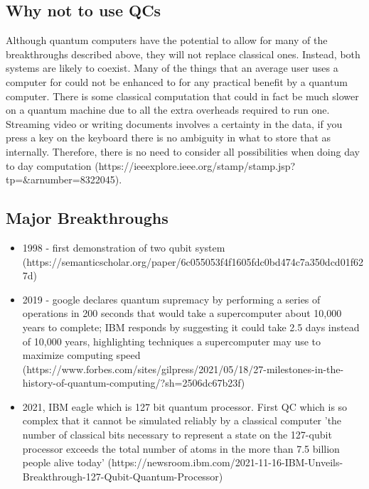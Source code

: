 \subsection{Why not to use QCs}
Although quantum computers have the potential to allow for many of the breakthroughs described above, they will not replace classical ones. Instead, both systems are likely to coexist. Many of the things that an average user uses a computer for could not be enhanced to for any practical benefit by a quantum computer. There is some classical computation that could in fact be much slower on a quantum machine due to all the extra overheads required to run one. Streaming video or writing documents involves a certainty in the data, if you press a key on the keyboard there is no ambiguity in what to store that as internally. Therefore, there is no need to consider all possibilities when doing day to day computation (https://ieeexplore.ieee.org/stamp/stamp.jsp?tp=&arnumber=8322045).

\subsection{Major Breakthroughs}
\begin{itemize}
    \item 1998 - first demonstration of two qubit system (https://semanticscholar.org/paper/6c055053f4f1605fdc0bd474c7a350dcd01f627d)
    \item 2019 - google declares quantum supremacy by performing a series of operations in 200 seconds that would take a supercomputer about 10,000 years to complete; IBM responds by suggesting it could take 2.5 days instead of 10,000 years, highlighting techniques a supercomputer may use to maximize computing speed (https://www.forbes.com/sites/gilpress/2021/05/18/27-milestones-in-the-history-of-quantum-computing/?sh=2506dc67b23f)
    \item 2021, IBM eagle which is 127 bit quantum processor. First QC which is so complex that it cannot be simulated reliably by a classical computer 'the number of classical bits necessary to represent a state on the 127-qubit processor exceeds the total number of atoms in the more than 7.5 billion people alive today' (https://newsroom.ibm.com/2021-11-16-IBM-Unveils-Breakthrough-127-Qubit-Quantum-Processor)
\end{itemize}


